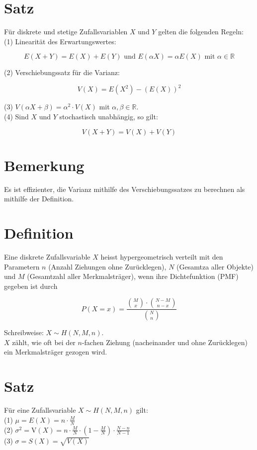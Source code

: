 \documentclass[10pt]{article}
\begin{document}
\section*{Satz}
Für diskrete und stetige Zufallsvariablen $X$ und $Y$ gelten die folgenden Regeln:\\
(1) Linearität des Erwartungswertes:

$$
E(X+Y)=E(X)+E(Y) \text { und } E(\alpha X)=\alpha E(X) \text { mit } \alpha \in \mathbb{R}
$$

(2) Verschiebungssatz für die Varianz:

$$
V(X)=E\left(X^{2}\right)-(E(X))^{2}
$$

(3) $V(\alpha X+\beta)=\alpha^{2} \cdot V(X)$ mit $\alpha, \beta \in \mathbb{R}$.\\
(4) Sind $X$ und $Y$ stochastisch unabhängig, so gilt:

$$
V(X+Y)=V(X)+V(Y)
$$

\section*{Bemerkung}
Es ist effizienter, die Varianz mithilfe des Verschiebungssatzes zu berechnen als mithilfe der Definition.

\section*{Definition}
Eine diskrete Zufallsvariable $X$ heisst hypergeometrisch verteilt mit den Parametern $n$ (Anzahl Ziehungen ohne Zurücklegen), $N$ (Gesamtza aller Objekte) und $M$ (Gesamtzahl aller Merkmalsträger), wenn ihre Dichtefunktion (PMF) gegeben ist durch

$$
P(X=x)=\frac{\binom{M}{x} \cdot\binom{N-M}{n-x}}{\binom{N}{n}}
$$

Schreibweise: $X \sim H(N, M, n)$.\\
$X$ zählt, wie oft bei der $n$-fachen Ziehung (nacheinander und ohne Zurücklegen) ein Merkmalsträger gezogen wird.

\section*{Satz}
Für eine Zufallsvariable $X \sim H(N, M, n)$ gilt:\\
(1) $\mu=E(X)=n \cdot \frac{M}{N}$\\
(2) $\sigma^{2}=\mathrm{V}(X)=n \cdot \frac{M}{N} \cdot\left(1-\frac{M}{N}\right) \cdot \frac{N-n}{N-1}$\\
(3) $\sigma=S(X)=\sqrt{V(X)}$
\end{document}
